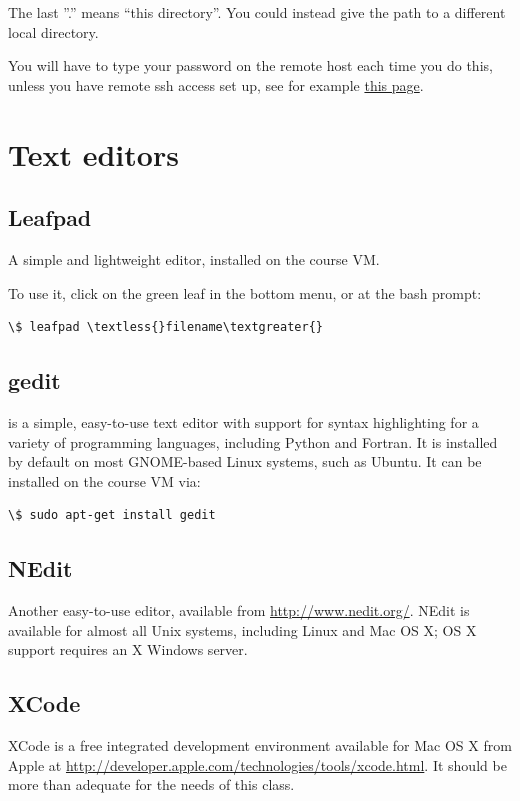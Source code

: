 \documentclass[letterpaper,10pt,english]{sphinxmanual}
\begin{document}
The last ''.'' means ``this directory''.  You could instead give the path to a
different local directory.

You will have to type your password on the remote host each
time you do this, unless you have remote ssh access set up, see for example
\href{http://www.debian.org/devel/passwordlessssh}{this page}.


\section{Text editors}
\label{editors:text-editors}\label{editors::doc}\label{editors:editors}

\subsection{Leafpad}
\label{editors:leafpad}
A simple and lightweight editor, installed on the course VM.

To use it, click on the green leaf in the bottom menu, or at the bash
prompt:

\begin{Verbatim}[commandchars=\\\{\}]
\$ leafpad \textless{}filename\textgreater{}
\end{Verbatim}


\subsection{gedit}
\label{editors:gedit}
 is a simple, easy-to-use text editor with support for syntax
highlighting for a variety of programming languages, including Python
and Fortran.  It is installed by default on most GNOME-based Linux
systems, such as Ubuntu.  It can be installed on the course VM via:

\begin{Verbatim}[commandchars=\\\{\}]
\$ sudo apt-get install gedit
\end{Verbatim}


\subsection{NEdit}
\label{editors:nedit}
Another easy-to-use editor, available from \href{http://www.nedit.org/}{http://www.nedit.org/}.
NEdit is available for almost all Unix systems, including Linux and
Mac OS X; OS X support requires an X Windows server.


\subsection{XCode}
\label{editors:xcode}
XCode is a free integrated development environment available for Mac
OS X from Apple at
\href{http://developer.apple.com/technologies/tools/xcode.html}{http://developer.apple.com/technologies/tools/xcode.html}.  It
should be more than adequate for the needs of this class.
\end{document}
